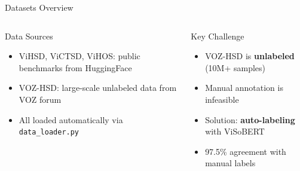 \documentclass[10pt, aspectratio=169]{beamer}
\begin{document}
\begin{frame}[shrink=5]{Datasets Overview}
  \begin{table}[h]
    \centering
    \caption{Datasets used in this project}
  \end{table}

  \vspace{0.2cm}
  \begin{columns}[T]
    \begin{block}{Data Sources}
      \begin{itemize}
        \item ViHSD, ViCTSD, ViHOS: public benchmarks from HuggingFace
        \item VOZ-HSD: large-scale unlabeled data from VOZ forum
        \item All loaded automatically via \texttt{data\_loader.py}
      \end{itemize}
    \end{block}

    \begin{alertblock}{Key Challenge}
      \begin{itemize}
        \item VOZ-HSD is \textbf{unlabeled} (10M+ samples)
        \item Manual annotation is infeasible
        \item Solution: \textbf{auto-labeling} with ViSoBERT
        \item 97.5\% agreement with manual labels
      \end{itemize}
    \end{alertblock}
  \end{columns}
\end{frame}
\end{document}
